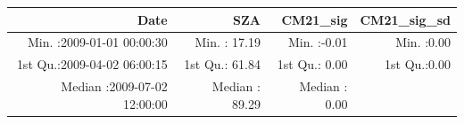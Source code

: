 \documentclass[
  10pt,
  a4paper,oneside]{article}
\begin{document}
\begin{longtable}[]{@{}rrrr@{}}
\toprule
\begin{minipage}[b]{0.34\columnwidth}\raggedleft
Date\strut
\end{minipage} & \begin{minipage}[b]{0.19\columnwidth}\raggedleft
SZA\strut
\end{minipage} & \begin{minipage}[b]{0.18\columnwidth}\raggedleft
CM21\_sig\strut
\end{minipage} & \begin{minipage}[b]{0.18\columnwidth}\raggedleft
CM21\_sig\_sd\strut
\end{minipage}\tabularnewline
\midrule
\endhead
\begin{minipage}[t]{0.34\columnwidth}\raggedleft
Min. :2009-01-01 00:00:30\strut
\end{minipage} & \begin{minipage}[t]{0.19\columnwidth}\raggedleft
Min. : 17.19\strut
\end{minipage} & \begin{minipage}[t]{0.18\columnwidth}\raggedleft
Min. :-0.01\strut
\end{minipage} & \begin{minipage}[t]{0.18\columnwidth}\raggedleft
Min. :0.00\strut
\end{minipage}\tabularnewline
\begin{minipage}[t]{0.34\columnwidth}\raggedleft
1st Qu.:2009-04-02 06:00:15\strut
\end{minipage} & \begin{minipage}[t]{0.19\columnwidth}\raggedleft
1st Qu.: 61.84\strut
\end{minipage} & \begin{minipage}[t]{0.18\columnwidth}\raggedleft
1st Qu.: 0.00\strut
\end{minipage} & \begin{minipage}[t]{0.18\columnwidth}\raggedleft
1st Qu.:0.00\strut
\end{minipage}\tabularnewline
\begin{minipage}[t]{0.34\columnwidth}\raggedleft
Median :2009-07-02 12:00:00\strut
\end{minipage} & \begin{minipage}[t]{0.19\columnwidth}\raggedleft
Median : 89.29\strut
\end{minipage} & \begin{minipage}[t]{0.18\columnwidth}\raggedleft
Median : 0.00\strut
\end{minipage} & \begin{minipage}[t]{0.18\columnwidth}\raggedleft

\end{minipage}
\end{longtable}
\end{document}

